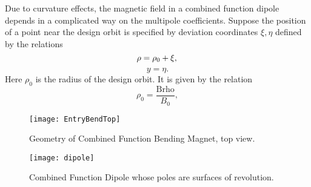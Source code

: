     Due to curvature effects, the magnetic field in a combined function dipole depends in a complicated way on the multipole coefficients.  Suppose the position of a point near the design orbit is specified by deviation coordinates $\xi,\eta$ defined by the relations
\begin{equation}
\rho = \rho_0 + \xi, \\
\end{equation}
\begin{equation}
y = \eta.
\end{equation}
Here $\rho_0$ is the radius of the design orbit.  It is given by the relation
\begin{equation}
\rho_0 = \frac{\mbox{Brho}}{B_0},
\end{equation}

\begin{figure}[h]
  \centering
  \texttt{[image: EntryBendTop]}
  \caption{Geometry of Combined Function Bending Magnet, top view.}
\end{figure}

\begin{figure}[htp]
  \centering
  \texttt{[image: dipole]}
  \caption{Combined Function Dipole whose poles are surfaces of revolution.}
\end{figure}

